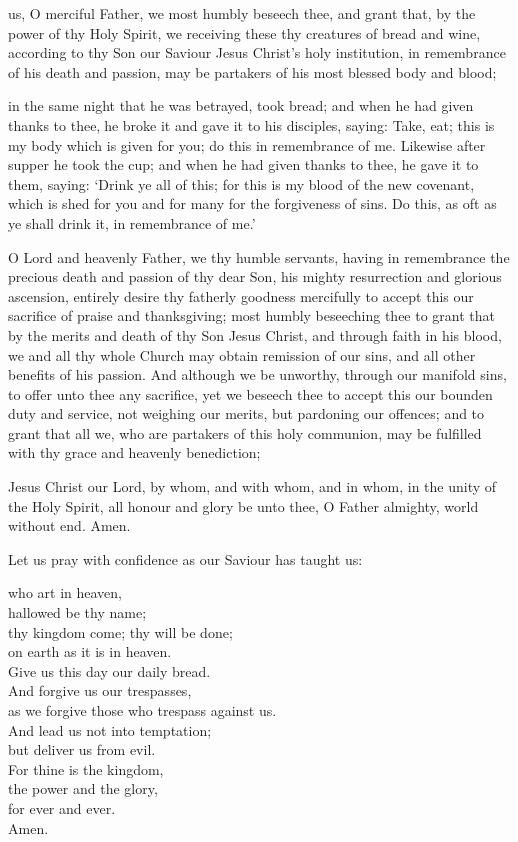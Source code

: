 { us, O merciful Father, we most humbly beseech thee,
and grant that, by the power of thy Holy Spirit,
we receiving these thy creatures of bread and wine,
according to thy Son our Saviour Jesus Christ’s holy institution,
in remembrance of his death and passion,
may be partakers of his most blessed body and blood;


 in the same night that he was betrayed, took bread;
and when he had given thanks to thee,he broke it and gave it to his disciples, saying:
Take, eat; this is my body which is given for you;
do this in remembrance of me.
Likewise after supper he took the cup;
and when he had given thanks to thee, he gave it to them, saying:
`Drink ye all of this;
for this is my blood of the new covenant,
which is shed for you and for many for the forgiveness of sins.
Do this, as oft as ye shall drink it,
in remembrance of me.'

\clearpage 
{} O Lord and heavenly Father,
we thy humble servants, having in remembrance
the precious death and passion of thy dear Son,
his mighty resurrection and glorious ascension,
entirely desire thy fatherly goodness
mercifully to accept this our sacrifice of praise and thanksgiving;
most humbly beseeching thee to grant that
by the merits and death of thy Son Jesus Christ,
and through faith in his blood,
we and all thy whole Church may obtain remission of our sins,
and all other benefits of his passion.
And although we be unworthy, through our manifold sins,
to offer unto thee any sacrifice, yet we beseech thee
to accept this our bounden duty and service,
not weighing our merits, but pardoning our offences;
and to grant that all we, who are partakers of this holy communion,
may be fulfilled with thy grace and heavenly benediction;



 Jesus Christ our Lord,
by whom, and with whom, and in whom,
in the unity of the Holy Spirit,
all honour and glory be unto thee,
O Father almighty,
world without end.
Amen.

\vfill 

Let us pray with confidence as our Saviour has taught us:

 who art in heaven,\\
hallowed be thy name;\\
thy kingdom come; 
thy will be done;\\
on earth as it is in heaven.\\
Give us this day our daily bread.\\
And forgive us our trespasses, \\as we forgive those who trespass against us.\\
And lead us not into temptation;\\
but deliver us from evil.\\
For thine is the kingdom,\\
the power and the glory,\\
for ever and ever.\\
Amen.

}
